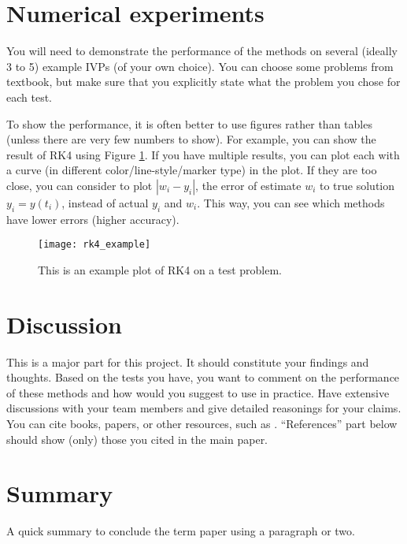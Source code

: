 \documentclass[11pt]{article}	%
\begin{document}
\section{Numerical experiments}
You will need to demonstrate the performance
of the methods on several (ideally 3 to 5) example IVPs (of your own choice).
You can choose some problems from textbook, but make sure that you 
explicitly state what the problem you chose for each test.

To show the performance, it is often better to use figures
rather than tables (unless there are very few numbers to show). 
For example, you can show the result of RK4
using Figure \ref{fig:rk4_example}. If you have multiple results, you can plot each
with a curve (in different color/line-style/marker type) in the plot. If they are too close, you can consider to 
plot $|w_i-y_i|$, the error of estimate $w_i$ to true solution $y_i=y(t_i)$,
instead of actual $y_i$ and $w_i$. This way, you can see which methods have lower errors (higher accuracy).

\begin{figure}
\centering
\texttt{[image: rk4\_example]}
\caption{This is an example plot of RK4 on a test problem.}
\label{fig:rk4_example}
\end{figure}

\section{Discussion}
This is a major part for this project. It should constitute your findings and thoughts. 
Based on the tests you have,
you want to comment on the performance of these methods and how would you
suggest to use in practice. Have extensive discussions with your team members
and give detailed reasonings for your claims. You can cite books, papers, or other
resources, such as \cite{Burden:2011a}. ``References'' part below should show
(only) those you cited in the main paper.


\section{Summary}
A quick summary to conclude the term paper using a paragraph or two.



\end{document}
